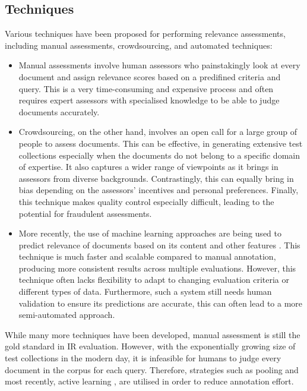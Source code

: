 \documentclass{l4proj}
\begin{document}
\subsection{Techniques}
Various techniques have been proposed for performing relevance assessments, including manual assessments, crowdsourcing, and automated techniques:
\begin{itemize}
    \item Manual assessments involve human assessors who painstakingly look at every document and assign relevance scores based on a predifined criteria and query. This is a very time-consuming and expensive process and often requires expert assessors with specialised knowledge to be able to judge documents accurately. 

    \item Crowdsourcing, on the other hand, involves an open call for a large group of people to assess documents. This can be effective, in generating extensive test collections especially when the documents do not belong to a specific domain of expertise. It also captures a wider range of viewpoints as it brings in assessors from diverse backgrounds. Contrastingly, this can equally bring in bias depending on the assessors' incentives and personal preferences. Finally, this technique makes quality control especially difficult, leading to the potential for fraudulent assessments.
    
    \item More recently, the use of machine learning approaches are being used to predict relevance of documents based on its content and other features \citep{cao2007ltr}. This technique is much faster and scalable compared to manual annotation, producing more consistent results across multiple evaluations. However, this technique often lacks flexibility to adapt to changing evaluation criteria or different types of data. Furthermore, such a system still needs human validation to ensure its predictions are accurate, this can often lead to a more semi-automated approach.
\end{itemize}

While many more techniques have been developed, manual assessment is still the gold standard in IR evaluation. However, with the exponentially growing size of test collections in the modern day, it is infeasible for humans to judge every document in the corpus for each query. Therefore, strategies such as pooling and most recently, active learning \citep{rahman2020al}, are utilised in order to reduce annotation effort. 
\end{document}
